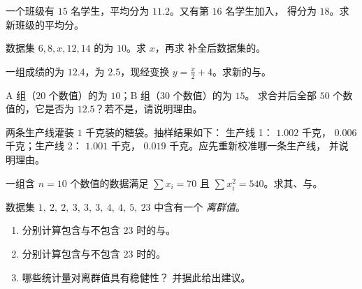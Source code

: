 \begin{exercise}[$\star\star$]\label{exo:g11:stat:4}
一个班级有 $15$ 名学生，平均分为 $11.2$。又有第 $16$ 名学生加入，
得分为 $18$。求新班级的平均分。
\end{exercise}

\begin{exercise}[$\star\star$]\label{exo:g11:stat:5}
数据集 $6, 8, x, 12, 14$ 的为 $10$。求 $x$，再求
补全后数据集的。
\end{exercise}

\begin{exercise}[$\star$]\label{exo:g11:stat:6}
一组成绩的为 $12.4$，为 $2.5$，现经变换
$y = \frac{x}{2} + 4$。求新的与。
\end{exercise}

\begin{exercise}[$\star\star$]\label{exo:g11:stat:7}
A 组（$20$ 个数值）的为 $10$；B 组（$30$ 个数值）的为 $15$。
求合并后全部 $50$ 个数值的，它是否为
$12.5$？若不是，请说明理由。
\end{exercise}

\begin{exercise}[$\star\star$]\label{exo:g11:stat:8}
两条生产线灌装 $1$ 千克装的糖袋。抽样结果如下：
生产线 1： $1.002$ 千克， $0.006$ 千克；生产线 2：
$1.001$ 千克， $0.019$ 千克。应先重新校准哪一条生产线，
并说明理由。
\end{exercise}

\begin{exercise}[$\star\star$]\label{exo:g11:stat:9}
一组含 $n = 10$ 个数值的数据满足 $\sum x_i = 70$ 且
$\sum x_i^2 = 540$。求其、与。
\end{exercise}

\begin{exercise}[$\star\star\star$]\label{exo:g11:stat:10}
数据集 $1,\ 2,\ 2,\ 3,\ 3,\ 3,\ 4,\ 4,\ 5,\ 23$ 中含有一个
\emph{离群值}。
\begin{enumerate}
  \item 分别计算包含与不包含 $23$ 时的与。
  \item 分别计算包含与不包含 $23$ 时的。
  \item 哪些统计量对离群值具有稳健性？
        并据此给出建议。
\end{enumerate}
\end{exercise}

